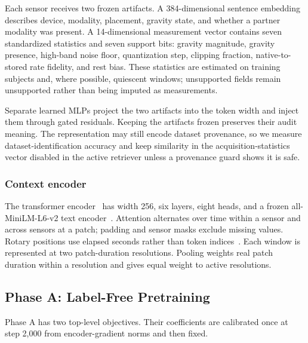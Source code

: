 Each sensor receives two frozen artifacts. A 384-dimensional sentence embedding describes device,
modality, placement, gravity state, and whether a partner modality was present. A 14-dimensional
measurement vector contains seven standardized statistics and seven support bits: gravity
magnitude, gravity presence, high-band noise floor, quantization step, clipping fraction, native-to-
stored rate fidelity, and rest bias. These statistics are estimated on training subjects and, where
possible, quiescent windows; unsupported fields remain unsupported rather than being imputed as
measurements.

Separate learned MLPs project the two artifacts into the token width and inject them through gated
residuals. Keeping the artifacts frozen preserves their audit meaning. The representation may still
encode dataset provenance, so we measure dataset-identification accuracy and keep similarity in the
acquisition-statistics vector disabled in the active retriever unless a provenance guard shows it is
safe.

\subsubsection{Context encoder}
\label{sec:encoder}

The transformer encoder~\cite{transformer} has width 256, six layers, eight heads, and a frozen
all-MiniLM-L6-v2 text encoder~\cite{sbert}. Attention alternates over time within a sensor and across sensors at a patch;
padding and sensor masks exclude missing values. Rotary positions use elapsed seconds rather than
token indices~\cite{rope}. Each window is represented at two patch-duration resolutions. Pooling weights real
patch duration within a resolution and gives equal weight to active resolutions.

\subsection{Phase A: Label-Free Pretraining}
\label{sec:phaseA_design}

Phase A has two top-level objectives. Their coefficients are calibrated once at step 2,000 from
encoder-gradient norms and then fixed.

